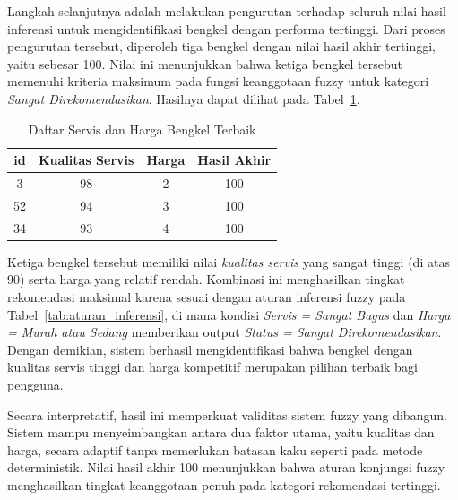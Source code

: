 \documentclass[12pt,a4paper]{article}
\theoremstyle{remark}
\begin{document}
Langkah selanjutnya adalah melakukan pengurutan terhadap seluruh nilai hasil inferensi untuk mengidentifikasi bengkel dengan performa tertinggi. Dari proses pengurutan tersebut, diperoleh tiga bengkel dengan nilai hasil akhir tertinggi, yaitu sebesar 100. Nilai ini menunjukkan bahwa ketiga bengkel tersebut memenuhi kriteria maksimum pada fungsi keanggotaan fuzzy untuk kategori \textit{Sangat Direkomendasikan}. Hasilnya dapat dilihat pada Tabel~\ref{tab:hasil_terbaik_kesimpulan}.

\begin{table}[H]
    \centering
    \caption{Daftar Servis dan Harga Bengkel Terbaik}
    \label{tab:hasil_terbaik_kesimpulan}
    \begin{tabular}{|c|c|c|c|}
        \hline
        \textbf{id} & \textbf{Kualitas Servis} & \textbf{Harga} & \textbf{Hasil Akhir} \\ \hline
        3           & 98                       & 2              & 100                  \\
        52          & 94                       & 3              & 100                  \\
        34          & 93                       & 4              & 100                  \\
        \hline
    \end{tabular}
\end{table}

Ketiga bengkel tersebut memiliki nilai \textit{kualitas servis} yang sangat tinggi (di atas 90) serta harga yang relatif rendah. Kombinasi ini menghasilkan tingkat rekomendasi maksimal karena sesuai dengan aturan inferensi fuzzy pada Tabel~\ref{tab:aturan_inferensi}, di mana kondisi \textit{Servis = Sangat Bagus} dan \textit{Harga = Murah atau Sedang} memberikan output \textit{Status = Sangat Direkomendasikan}. Dengan demikian, sistem berhasil mengidentifikasi bahwa bengkel dengan kualitas servis tinggi dan harga kompetitif merupakan pilihan terbaik bagi pengguna.

Secara interpretatif, hasil ini memperkuat validitas sistem fuzzy yang dibangun. Sistem mampu menyeimbangkan antara dua faktor utama, yaitu kualitas dan harga, secara adaptif tanpa memerlukan batasan kaku seperti pada metode deterministik. Nilai hasil akhir 100 menunjukkan bahwa aturan konjungsi fuzzy menghasilkan tingkat keanggotaan penuh pada kategori rekomendasi tertinggi.


\newpage
\printbibliography[title={Referensi}]
\end{document}
